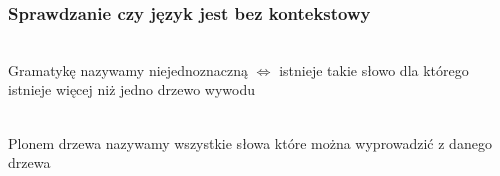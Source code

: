 \subsubsection{Sprawdzanie czy język jest bez kontekstowy}

	\begin{df}~\\
		Gramatykę nazywamy niejednoznaczną $\Leftrightarrow$ istnieje takie słowo dla którego istnieje więcej niż jedno drzewo wywodu		
	\end{df}
	
	\begin{df}~\\
		Plonem drzewa nazywamy wszystkie słowa które można wyprowadzić z danego drzewa
	\end{df}	
	
